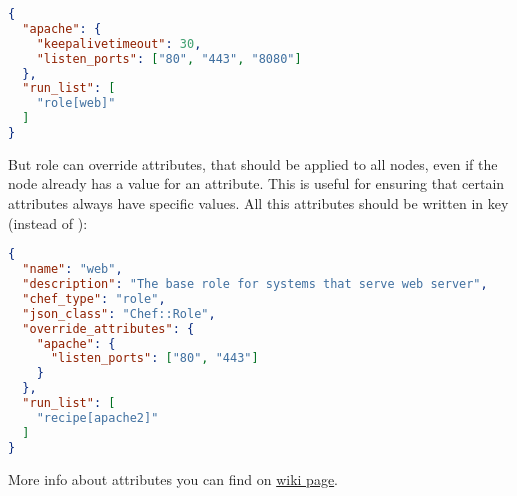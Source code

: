 \begin{lstlisting}[language=JSON,label=lst:my-cloud-attributes3]
{
  "apache": {
    "keepalivetimeout": 30,
    "listen_ports": ["80", "443", "8080"]
  },
  "run_list": [
    "role[web]"
  ]
}
\end{lstlisting}

But role can override attributes, that should be applied to all nodes, even if the node already has a value for an attribute. This is useful for ensuring that certain attributes always have specific values. All this attributes should be written in  key (instead of ):

\begin{lstlisting}[language=JSON,label=lst:my-cloud-attributes2]
{
  "name": "web",
  "description": "The base role for systems that serve web server",
  "chef_type": "role",
  "json_class": "Chef::Role",
  "override_attributes": {
    "apache": {
      "listen_ports": ["80", "443"]
    }
  },
  "run_list": [
    "recipe[apache2]"
  ]
}
\end{lstlisting}

More info about attributes you can find on \href{http://docs.opscode.com/chef_overview_attributes.html}{wiki page}.